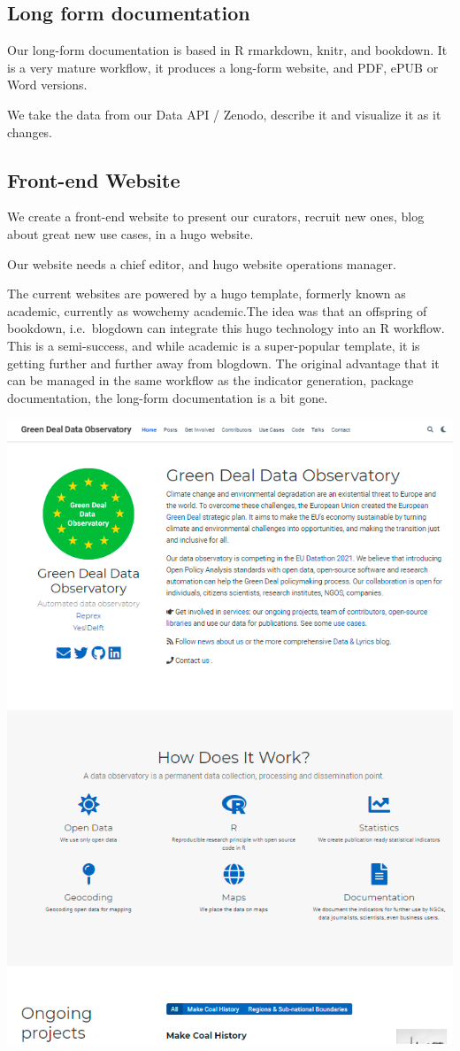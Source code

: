 \documentclass[
  a4paper,
  openany, a4paper, oneside]{book}
\begin{document}
\hypertarget{long-form-documentation}{%
\subsection{Long form documentation}\label{long-form-documentation}}

Our long-form documentation is based in R rmarkdown, knitr, and bookdown. It is a very mature workflow, it produces a long-form website, and PDF, ePUB or Word versions.

We take the data from our Data API / Zenodo, describe it and visualize it as it changes.

\hypertarget{front-end-website}{%
\subsection{Front-end Website}\label{front-end-website}}

We create a front-end website to present our curators, recruit new ones, blog about great new use cases, in a hugo website.

Our website needs a chief editor, and hugo website operations manager.

The current websites are powered by a hugo template, formerly known as academic, currently as wowchemy academic.The idea was that an offspring of bookdown, i.e.~blogdown can integrate this hugo technology into an R workflow. This is a semi-success, and while academic is a super-popular template, it is getting further and further away from blogdown. The original advantage that it can be managed in the same workflow as the indicator generation, package documentation, the long-form documentation is a bit gone.

\begin{center}\includegraphics[width=0.8\linewidth]{plots/green_deal_hugo} \end{center}
\end{document}

